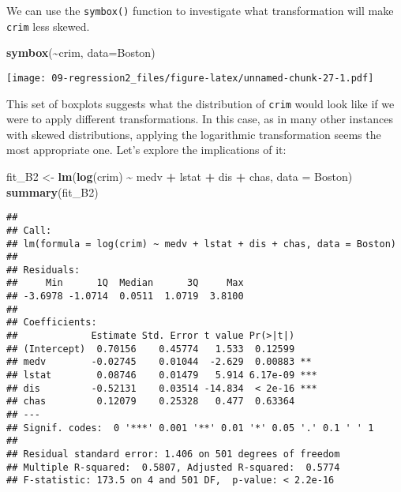 \documentclass[
]{book}
\newenvironment{Shaded}{\begin{snugshade}}{\end{snugshade}}
\newcommand{\AttributeTok}[1]{\textcolor[rgb]{0.13,0.29,0.53}{#1}}
\newcommand{\FunctionTok}[1]{\textcolor[rgb]{0.13,0.29,0.53}{\textbf{#1}}}
\newcommand{\NormalTok}[1]{#1}
\newcommand{\OtherTok}[1]{\textcolor[rgb]{0.56,0.35,0.01}{#1}}
\newcommand{\SpecialCharTok}[1]{\textcolor[rgb]{0.81,0.36,0.00}{\textbf{#1}}}
\begin{document}
We can use the \texttt{symbox()} function to investigate what transformation will make \texttt{crim} less skewed.

\begin{Shaded}
\begin{Highlighting}[]
\FunctionTok{symbox}\NormalTok{(}\SpecialCharTok{\textasciitilde{}}\NormalTok{crim, }\AttributeTok{data=}\NormalTok{Boston)}
\end{Highlighting}
\end{Shaded}

\texttt{[image: 09-regression2\_files/figure-latex/unnamed-chunk-27-1.pdf]}

This set of boxplots suggests what the distribution of \texttt{crim} would look like if we were to apply different transformations. In this case, as in many other instances with skewed distributions, applying the logarithmic transformation seems the most appropriate one. Let's explore the implications of it:

\begin{Shaded}
\begin{Highlighting}[]
\NormalTok{fit\_B2 }\OtherTok{\textless{}{-}} \FunctionTok{lm}\NormalTok{(}\FunctionTok{log}\NormalTok{(crim) }\SpecialCharTok{\textasciitilde{}}\NormalTok{ medv }\SpecialCharTok{+}\NormalTok{ lstat }\SpecialCharTok{+}\NormalTok{ dis }\SpecialCharTok{+}\NormalTok{ chas, }\AttributeTok{data =}\NormalTok{ Boston)}
\FunctionTok{summary}\NormalTok{(fit\_B2)}
\end{Highlighting}
\end{Shaded}

\begin{verbatim}
## 
## Call:
## lm(formula = log(crim) ~ medv + lstat + dis + chas, data = Boston)
## 
## Residuals:
##     Min      1Q  Median      3Q     Max 
## -3.6978 -1.0714  0.0511  1.0719  3.8100 
## 
## Coefficients:
##             Estimate Std. Error t value Pr(>|t|)    
## (Intercept)  0.70156    0.45774   1.533  0.12599    
## medv        -0.02745    0.01044  -2.629  0.00883 ** 
## lstat        0.08746    0.01479   5.914 6.17e-09 ***
## dis         -0.52131    0.03514 -14.834  < 2e-16 ***
## chas         0.12079    0.25328   0.477  0.63364    
## ---
## Signif. codes:  0 '***' 0.001 '**' 0.01 '*' 0.05 '.' 0.1 ' ' 1
## 
## Residual standard error: 1.406 on 501 degrees of freedom
## Multiple R-squared:  0.5807, Adjusted R-squared:  0.5774 
## F-statistic: 173.5 on 4 and 501 DF,  p-value: < 2.2e-16
\end{verbatim}
\end{document}
